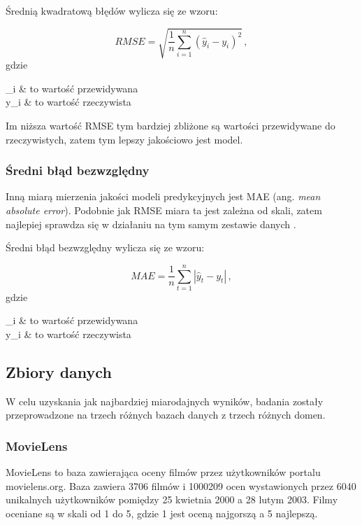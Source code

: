 \documentclass[twoside]{iisthesis}
\begin{document}
		Średnią kwadratową błędów wylicza się ze wzoru:
		
		\begin{equation}
			\label{eq:rmse}
			RMSE = \sqrt{ \frac{1}{n} \sum_{i=1}^{n} (\hat{y}_i - y_i)^2 }
			\,,
		\end{equation}	
		gdzie
		
		\begin{conditions*}
			_i & to wartość przewidywana \\
			y_i  &  to wartość rzeczywista
		\end{conditions*} 
		
		Im niższa wartość RMSE tym bardziej zbliżone są wartości przewidywane do rzeczywistych, zatem tym lepszy jakościowo jest model. 
		
		\subsubsection{Średni błąd bezwzględny}
		
		Inną miarą mierzenia jakości modeli predykcyjnych jest MAE (ang. \textit{mean absolute error}). Podobnie jak RMSE miara ta jest zależna od skali, zatem najlepiej sprawdza się w działaniu na tym samym zestawie danych \cite{hyndman2006another}. 
		
		Średni błąd bezwzględny wylicza się ze wzoru:
		
		\begin{equation}
		\label{eq:mae}
		MAE = \frac{1}{n} \sum_{t=1}^{n} |\hat{y}_t - y_t|
		\,,
		\end{equation}		
		gdzie
		
		\begin{conditions*}
			_i & to wartość przewidywana \\
			y_i  &  to wartość rzeczywista
		\end{conditions*} 
	
	
		\subsection{Zbiory danych}
		
		W celu uzyskania jak najbardziej miarodajnych wyników, badania zostały przeprowadzone na trzech różnych bazach danych z trzech różnych domen. 
		
		\subsubsection{MovieLens}
		MovieLens \cite{harper2016movielens} to baza zawierająca oceny filmów przez użytkowników portalu movielens.org. Baza zawiera 3706 filmów i 1000209 ocen wystawionych przez 6040 unikalnych użytkowników pomiędzy 25 kwietnia 2000 a 28 lutym 2003. Filmy oceniane są w skali od 1 do 5, gdzie 1 jest oceną najgorszą a 5 najlepszą. 
		
\end{document}
